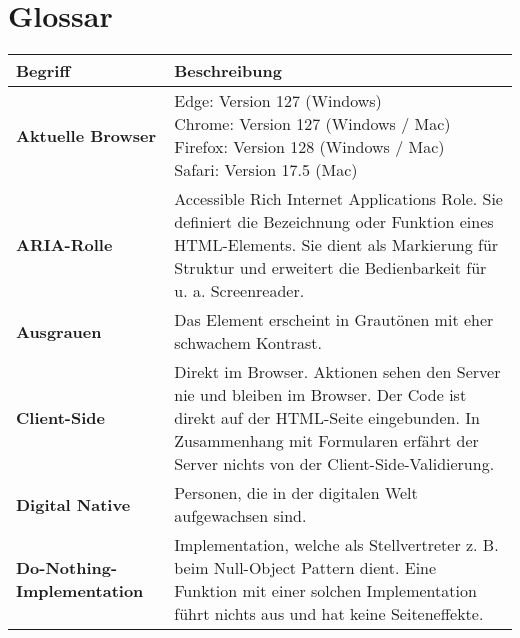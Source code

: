 \chapter{Glossar}
\label{chap:glossary}

\newcommand{\glossarywithTitle}{0.22\textwidth}
\newcommand{\glossarywith}{0.76\textwidth}

\vspace*{-1cm}
\begin{table}[!ht]
    \centering
    \footnotesize
    \begin{adjustbox}{max width=\textwidth}
        \begin{tabular}{ p{\glossarywithTitle} | p{\glossarywith} }
            \bf{Begriff} & \bf{Beschreibung} \\
            \hline \hline
            \bf{Aktuelle Browser} & \tbbr{
                Edge: Version 127 (Windows) \\
                Chrome: Version 127 (Windows / Mac) \\
                Firefox: Version 128 (Windows / Mac) \\
                Safari: Version 17.5 (Mac)
            } \\
            \hline
            \bf{ARIA-Rolle} & Accessible Rich Internet Applications Role.
                Sie definiert die Bezeichnung oder Funktion eines HTML-Elements.
                Sie dient als Markierung für Struktur und erweitert die Bedienbarkeit für u. a. Screenreader. \\
            \hline
            \bf{Ausgrauen} & Das Element erscheint in Grautönen mit eher schwachem Kontrast. \\
            \hline
            \bf{Client-Side} & Direkt im Browser. 
                Aktionen sehen den Server nie und bleiben im Browser. 
                Der Code ist direkt auf der HTML-Seite eingebunden. 
                In Zusammenhang mit Formularen erfährt der Server nichts von der Client-Side-Validierung. \\
            \hline
            \raggedright \bf{Digital Native} & Personen, die in der digitalen Welt aufgewachsen sind. \\
            \hline
            \raggedright \bf{Do-Nothing-Implementation} & 
                Implementation, welche als Stellvertreter z. B. beim Null-Object Pattern dient. 
                Eine Funktion mit einer solchen Implementation führt nichts aus und hat keine Seiteneffekte. \\

\end{tabular}
\end{adjustbox}
\end{table}
